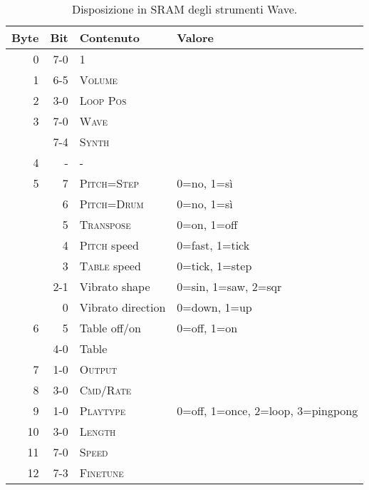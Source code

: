 \begin{table}
	\begin{center}
		\caption{Disposizione in SRAM degli strumenti Wave.}
		\begin{tabular}{r|r|l|l}
			\toprule
    Byte & Bit & Contenuto & Valore \\
    \midrule
    0  & 7-0 & 1 & \\
    1  & 6-5 & \textsc{Volume} 		& \\
    2  & 3-0 & \textsc{Loop Pos} 	& \\
    3  & 7-0 & \textsc{Wave} 		& \\
       & 7-4 & \textsc{Synth} 		& \\
    4  & -   & - & \\
    5  & 7   & \textsc{Pitch=Step} 	& 0=no, 1=sì \\
       & 6   & \textsc{Pitch=Drum} 	& 0=no, 1=sì \\
       & 5   & \textsc{Transpose} 	& 0=on, 1=off \\
       & 4   & \textsc{Pitch} speed	& 0=fast, 1=tick \\
       & 3   & \textsc{Table} speed	& 0=tick, 1=step \\
       & 2-1 & Vibrato shape		& 0=sin, 1=saw, 2=sqr \\
       & 0   & Vibrato direction	& 0=down, 1=up \\
    6  & 5   & Table off/on		& 0=off, 1=on \\
       & 4-0 & Table			& \\
    7  & 1-0 & \textsc{Output}		& \\
    8  & 3-0 & \textsc{Cmd/Rate}	& \\
    9  & 1-0 & \textsc{Playtype}	& 0=off, 1=once, 2=loop, 3=pingpong \\
    10 & 3-0 & \textsc{Length}		& \\
    11 & 7-0 & \textsc{Speed}		& \\
    12 & 7-3 & \textsc{Finetune}	& \\
    \bottomrule
		\end{tabular}
	\end{center}
\end{table}

